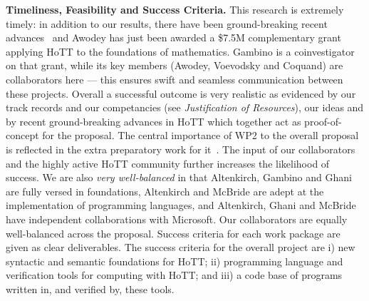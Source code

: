 \documentclass[a4paper,11pt]{article}
\begin{document}
{\bf Timeliness, Feasibility and Success Criteria.}  This research is
extremely timely: in addition to our results, there have been
ground-breaking recent advances~\cite{ShulmanM:uniidh,BezemM:cubsmt, nominal} and Awodey has just
been awarded a \$7.5M complementary grant applying HoTT to the
foundations of mathematics. Gambino is a coinvestigator on that grant,
while its key members (Awodey, Voevodsky and Coquand) are
collaborators here --- this ensures swift and seamless communication
between these projects.  Overall a successful outcome is very realistic
as evidenced by our track records and our competancies (see {\em
  Justification of Resources}), our ideas and by recent 
ground-breaking advances in HoTT which together act as
proof-of-concept for the proposal. The central importance of WP2 to the
overall proposal is reflected in the extra preparatory work for it~\cite{alti-ctt,txa-ihp14}.
The input of our collaborators and
the highly active HoTT community further increases the likelihood of
success. We are also {\em very well-balanced} in that Altenkirch,
Gambino and Ghani are fully versed in foundations, Altenkirch and
McBride are adept at the implementation of programming languages, and
Altenkirch, Ghani and McBride have independent collaborations with Microsoft. Our
collaborators are equally well-balanced across the 
proposal. Success criteria for each work package are given as clear
deliverables. The success criteria for the overall project are i) new
syntactic and semantic foundations for HoTT; ii) programming language
and verification tools for computing with HoTT; and iii) a code base
of programs written in, and verified by, these tools.  

\end{document}
